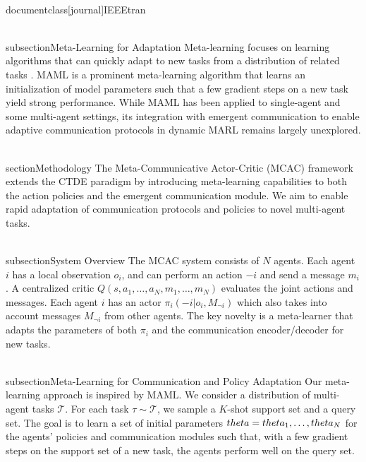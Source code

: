 \\documentclass[journal]{IEEEtran}
\begin{document}
\\subsection{Meta-Learning for Adaptation}
Meta-learning focuses on learning algorithms that can quickly adapt to new tasks from a distribution of related tasks \cite{Finn2017}. MAML is a prominent meta-learning algorithm that learns an initialization of model parameters such that a few gradient steps on a new task yield strong performance. While MAML has been applied to single-agent and some multi-agent settings, its integration with emergent communication to enable adaptive communication protocols in dynamic MARL remains largely unexplored.

\\section{Methodology}
The Meta-Communicative Actor-Critic (MCAC) framework extends the CTDE paradigm by introducing meta-learning capabilities to both the action policies and the emergent communication module. We aim to enable rapid adaptation of communication protocols and policies to novel multi-agent tasks.

\\subsection{System Overview}
The MCAC system consists of $N$ agents. Each agent $i$ has a local observation $o_i$, and can perform an action $-i$ and send a message $m_i$. A centralized critic $Q(s, a_1, \dots, a_N, m_1, \dots, m_N)$ evaluates the joint actions and messages. Each agent $i$ has an actor $\pi_i(-i | o_i, M_{\neg i})$ which also takes into account messages $M_{\neg i}$ from other agents. The key novelty is a meta-learner that adapts the parameters of both $\pi_i$ and the communication encoder/decoder for new tasks.

\\subsection{Meta-Learning for Communication and Policy Adaptation}
Our meta-learning approach is inspired by MAML. We consider a distribution of multi-agent tasks $\mathcal{T}$. For each task $\tau \sim \mathcal{T}$, we sample a $K$-shot support set and a query set. The goal is to learn a set of initial parameters $\\theta = \\{\\theta_1, \dots, \\theta_N\\}$ for the agents' policies and communication modules such that, with a few gradient steps on the support set of a new task, the agents perform well on the query set.
\end{document}
